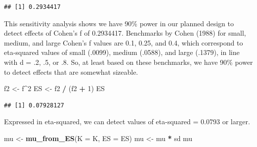 \documentclass[]{book}
\newenvironment{Shaded}{\begin{snugshade}}{\end{snugshade}}
\newcommand{\CommentTok}[1]{\textcolor[rgb]{0.56,0.35,0.01}{\textit{#1}}}
\newcommand{\DataTypeTok}[1]{\textcolor[rgb]{0.13,0.29,0.53}{#1}}
\newcommand{\DecValTok}[1]{\textcolor[rgb]{0.00,0.00,0.81}{#1}}
\newcommand{\FloatTok}[1]{\textcolor[rgb]{0.00,0.00,0.81}{#1}}
\newcommand{\KeywordTok}[1]{\textcolor[rgb]{0.13,0.29,0.53}{\textbf{#1}}}
\newcommand{\NormalTok}[1]{#1}
\newcommand{\OperatorTok}[1]{\textcolor[rgb]{0.81,0.36,0.00}{\textbf{#1}}}
\newcommand{\StringTok}[1]{\textcolor[rgb]{0.31,0.60,0.02}{#1}}
\begin{document}
\begin{Shaded}
\end{Shaded}

\begin{verbatim}
## [1] 0.2934417
\end{verbatim}

This sensitivity analysis shows we have 90\% power in our planned design to detect effects of Cohen's f of 0.2934417. Benchmarks by Cohen (1988) for small, medium, and large Cohen's f values are 0.1, 0.25, and 0.4, which correspond to eta-squared values of small (.0099), medium (.0588), and large (.1379), in line with d = .2, .5, or .8. So, at least based on these benchmarks, we have 90\% power to detect effects that are somewhat sizeable.

\begin{Shaded}
\begin{Highlighting}[]
\NormalTok{f2 <-}\StringTok{ }\NormalTok{f}\OperatorTok{^}\DecValTok{2}
\NormalTok{ES <-}\StringTok{ }\NormalTok{f2 }\OperatorTok{/}\StringTok{ }\NormalTok{(f2 }\OperatorTok{+}\StringTok{ }\DecValTok{1}\NormalTok{)}
\NormalTok{ES}
\end{Highlighting}
\end{Shaded}

\begin{verbatim}
## [1] 0.07928127
\end{verbatim}

Expressed in eta-squared, we can detect values of eta-squared = 0.0793 or larger.

\begin{Shaded}
\begin{Highlighting}[]
\NormalTok{mu <-}\StringTok{ }\KeywordTok{mu_from_ES}\NormalTok{(}\DataTypeTok{K =}\NormalTok{ K, }\DataTypeTok{ES =}\NormalTok{ ES)}
\NormalTok{mu <-}\StringTok{ }\NormalTok{mu }\OperatorTok{*}\StringTok{ }\NormalTok{sd}
\NormalTok{mu}
\end{Highlighting}
\end{Shaded}
\end{document}
